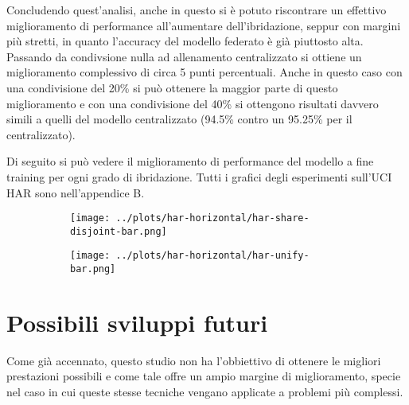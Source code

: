 Concludendo quest'analisi, anche in questo si è potuto riscontrare
un effettivo miglioramento di performance all'aumentare dell'ibridazione,
seppur con margini più stretti, in quanto l'accuracy del modello 
federato è già piuttosto alta. Passando da condivsione nulla ad allenamento
centralizzato si ottiene un miglioramento complessivo di circa 5 punti 
percentuali. Anche in questo caso con una condivisione del 20\% si può 
ottenere la maggior parte di questo miglioramento e con una condivisione 
del 40\% si ottengono risultati davvero simili a quelli del modello 
centralizzato (94.5\% contro un 95.25\% per il centralizzato).

Di seguito si può vedere il miglioramento di performance del modello a 
fine training per ogni grado di ibridazione.
Tutti i grafici degli esperimenti sull'UCI HAR sono nell'appendice B.
\begin{figure}[htp]
    \centering
    \begin{subfigure}[b]{0.8\textwidth}
        \centering
        \texttt{[image: ../plots/har-horizontal/har-share-disjoint-bar.png]}
    \end{subfigure}
    \hfill
    \begin{subfigure}[b]{0.8\textwidth}
        \centering
        \texttt{[image: ../plots/har-horizontal/har-unify-bar.png]}
    \end{subfigure}
\end{figure}


\section{Possibili sviluppi futuri}
Come già accennato, questo studio non ha l'obbiettivo di ottenere le 
migliori prestazioni possibili e come tale offre un ampio margine di 
miglioramento, specie nel caso in cui queste stesse tecniche vengano 
applicate a problemi più complessi.  


